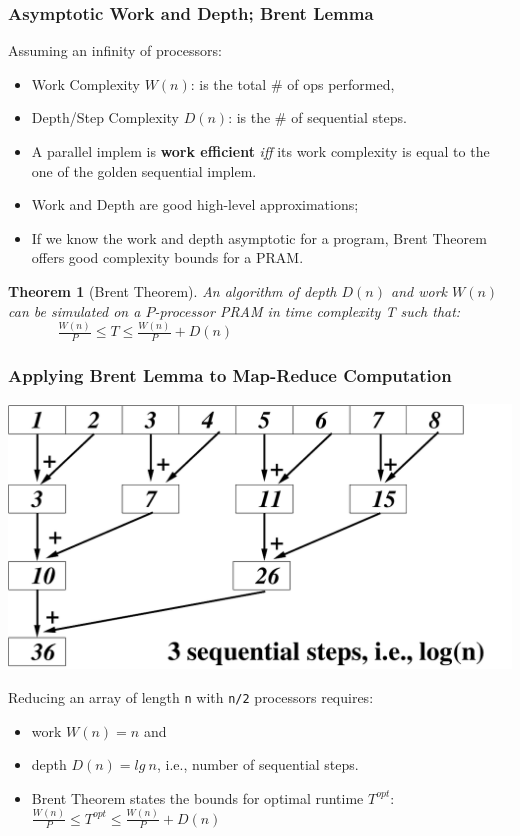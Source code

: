 \documentclass{beamer}
\newcommand{\emp}[1]{\textcolor{DikuRed}{ #1}}
\newtheorem{mytheo}{Theorem}
\begin{document}
\begin{frame}[fragile,t]
   \frametitle{Asymptotic Work and Depth; Brent Lemma}

Assuming an infinity of processors:
\begin{itemize}
    \item \emp{Work Complexity $W(n)$}:       is the total \# of ops performed,\smallskip
    \item \emp{Depth/Step Complexity $D(n)$}: is the \# of sequential steps.\bigskip
    \item A parallel implem is {\bf work efficient} {\it iff} its work complexity
            is equal to the one of the golden sequential implem.\bigskip

    \item Work and Depth are good high-level approximations;
    \item If we know the work and depth asymptotic for a program,
            Brent Theorem offers good complexity bounds for a PRAM.
\end{itemize}

\begin{mytheo}[Brent Theorem]\label{BrentTh}
An algorithm of depth $D(n)$ and work $W(n)$ can be
simulated on a $P$-processor PRAM in time complexity T such that:\\\bigskip
\emp{$\ \ \ \ \ \ \ \ \ \ \ \ \ \ \ \ \frac{W(n)}{P} \leq T \leq \frac{W(n)}{P} + D(n)$}
\end{mytheo}

\end{frame}

\begin{frame}[fragile,t]
   \frametitle{Applying Brent Lemma to Map-Reduce Computation}

\begin{center} 
\includegraphics[height=20ex]{img/day3/ReduceEg.pdf} 
\end{center} 

Reducing an array of length {\tt n} with {\tt n/2} processors requires:
\begin{itemize}
    \item work $W(n) = n$ and 
    \item depth $D(n) = lg \ n$, i.e., number of sequential steps.
    \item Brent Theorem states the bounds for optimal runtime $T^{opt}$:\\\smallskip
            $ \frac{W(n)}{P} \leq T^{opt} \leq \frac{W(n)}{P} + D(n)$
\end  {itemize}

\end{frame}
\end{document}
